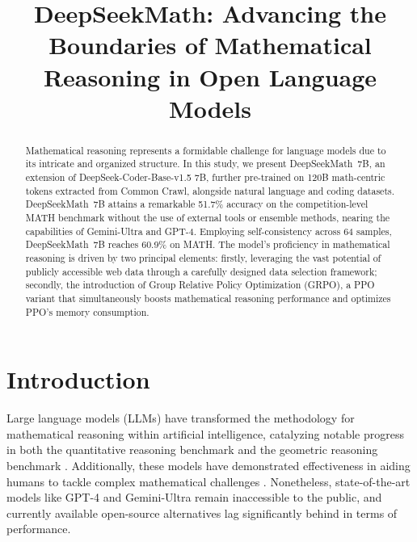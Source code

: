 \title{DeepSeekMath: Advancing the Boundaries of Mathematical Reasoning in Open Language Models}

\begin{abstract}
Mathematical reasoning represents a formidable challenge for language models due to its intricate and organized structure. In this study, we present DeepSeekMath~7B, an extension of DeepSeek-Coder-Base-v1.5 7B, further pre-trained on 120B math-centric tokens extracted from Common Crawl, alongside natural language and coding datasets. DeepSeekMath~7B attains a remarkable 51.7\% accuracy on the competition-level MATH benchmark without the use of external tools or ensemble methods, nearing the capabilities of Gemini-Ultra and GPT-4. Employing self-consistency across 64 samples, DeepSeekMath~7B reaches 60.9\% on MATH. The model’s proficiency in mathematical reasoning is driven by two principal elements: firstly, leveraging the vast potential of publicly accessible web data through a carefully designed data selection framework; secondly, the introduction of Group Relative Policy Optimization (GRPO), a PPO variant that simultaneously boosts mathematical reasoning performance and optimizes PPO’s memory consumption.
\end{abstract}

\section{Introduction}

Large language models (LLMs) have transformed the methodology for mathematical reasoning within artificial intelligence, catalyzing notable progress in both the quantitative reasoning benchmark \citep{MATH} and the geometric reasoning benchmark \citep{trinh2024solving}. Additionally, these models have demonstrated effectiveness in aiding humans to tackle complex mathematical challenges \citep{tao}. Nonetheless, state-of-the-art models like GPT-4 \citep{gpt4} and Gemini-Ultra \citep{gemini} remain inaccessible to the public, and currently available open-source alternatives lag significantly behind in terms of performance.

